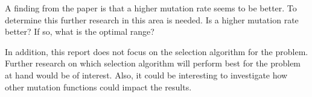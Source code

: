 A finding from the paper is that a higher mutation rate seems to be better. To determine this further research in this area is needed. Is a higher mutation rate better? If so, what is the optimal range?

In addition, this report does not focus on the selection algorithm for the problem. Further research on which selection algorithm will perform best for the problem at hand would be of interest. Also, it could be interesting to investigate how other mutation functions could impact the results.